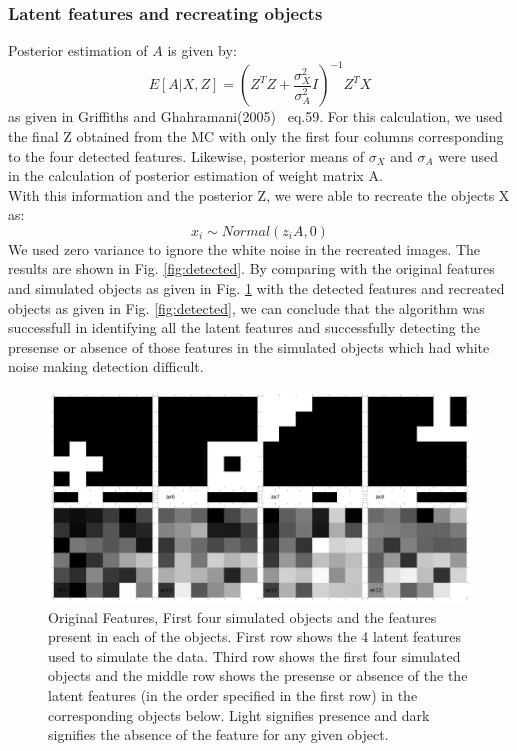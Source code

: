 \documentclass{article}
\begin{document}
\subsubsection{Latent features and recreating objects}
Posterior estimation of $A$ is given by:
\[
E[A|X,Z] = (Z^TZ+\frac{\sigma_X^2}{\sigma_A^2}I)^{-1}Z^TX
\]
as given in Griffiths and Ghahramani(2005)~\cite{griffiths1} eq.59. For this calculation, we used the final Z obtained from the MC with only the first four columns corresponding to the four detected features. Likewise, posterior means of $\sigma_X$ and $\sigma_A$ were used in the calculation of posterior estimation of weight matrix A.\\

With this information and the posterior Z, we were able to recreate the objects X as:
\[
x_i \sim Normal(z_iA,0)
\]
We used zero variance to ignore the white noise in the recreated images. The results are shown in Fig. \ref{fig:detected}. By comparing with the original features and simulated objects as given in Fig. \ref{fig:original} with the detected features and recreated objects as given in Fig. \ref{fig:detected}, we can conclude that the algorithm was successfull in identifying all the latent features and successfully detecting the presense or absence of those features in the simulated objects which had white noise making detection difficult.


\begin{figure}[ht]
\includegraphics[width=\linewidth]{figures/Original.png}
\caption {Original Features, First four simulated objects and the features present in each of the objects. First row shows the 4 latent features used to simulate the data. Third row shows the first four simulated objects and the middle row shows the presense or absence of the the latent features (in the order specified in the first row) in the corresponding objects below. Light signifies presence and dark signifies the absence of the feature for any given object.}
\label{fig:original}
\end{figure}
\end{document}
